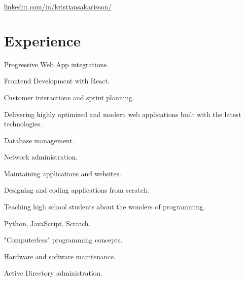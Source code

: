 \documentclass[]{deedy-resume-openfont}
\begin{document}

\href{https://www.linkedin.com/in/kristiansakarisson/}{linkedin.com/in/kristiansakarisson/}

\section{Experience}

\begin{tightemize}
\item Progressive Web App integrations.
\item Frontend Development with React.
\item Customer interactions and sprint planning.
\item Delivering highly optimized and modern web applications built with the latest technologies.
\end{tightemize}
\sectionsep

\begin{tightemize}
\item Database management.
\item Network administration.
\item Maintaining applications and websites.
\item Designing and coding applications from scratch.
\end{tightemize}
\sectionsep

\begin{tightemize}
\item Teaching high school students about the wonders of programming.
\item Python, JavaScript, Scratch.
\item "Computerless" programming concepts.
\end{tightemize}
\sectionsep

\begin{tightemize}
\item Hardware and software maintenance.
\item Active Directory administration.
\end{tightemize}
\sectionsep
\end{document}
